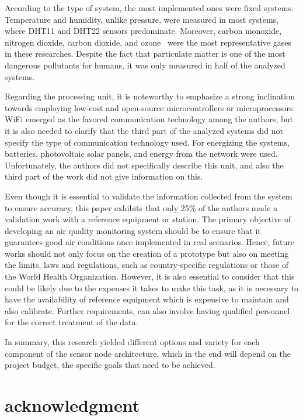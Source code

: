 \documentclass[10pt]{../imeko_acta}
\begin{document}
According to the type of system, the most implemented ones were fixed systems. 
Temperature and humidity, unlike pressure, were measured in most systems, where DHT11 and DHT22 sensors predominate. Moreover, carbon monoxide, nitrogen dioxide, carbon dioxide, and ozone~\cite{ozone} were the most representative gases in these researches. Despite the fact that particulate matter is one of the most dangerous pollutants for humans, it was only measured in half of the analyzed systems. 

Regarding the processing unit, it is noteworthy to emphasize a strong inclination towards employing low-cost and open-source microcontrollers or microprocessors. WiFi emerged as the favored communication technology among the authors, but it is also needed to clarify that the third part of the analyzed systems did not specify the type of communication technology used. For energizing the systems, batteries, photovoltaic solar panels, and energy from the network were used. Unfortunately, the authors did not specifically describe this unit, and also the third part of the work did not give information on this.

Even though it is essential to validate the information collected from the system to ensure accuracy, this paper exhibits that only 25\% of the authors made a validation work with a reference equipment or station. The primary objective of developing an air quality monitoring system should be to ensure that it guarantees good air conditions once implemented in real scenarios. Hence, future works should not only focus on the creation of a prototype but also on meeting the limits, laws and regulations, such as country-specific regulations or those of the World Health Organization. However, it is also essential to consider that this could be likely due to the expenses it takes to make this task, as it is necessary to have the availability of reference equipment which is expensive to maintain and also calibrate. Further requirements, can also involve having qualified personnel for the correct treatment of the data.

In summary, this research yielded different options and variety for each component of the sensor node architecture, which in the end will depend on the project budget, the specific goals that need to be achieved.


\section*{acknowledgment} 
\end{document}
